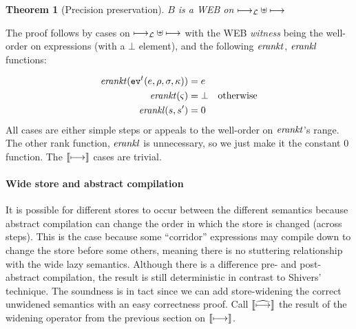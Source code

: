 \documentclass[9pt]{sigplanconf} %
\newtheorem{theorem}{Theorem}
\begin{document}
\begin{theorem}[Precision preservation]
$B$ is a WEB on $\lmachstep \uplus \machstep$
\end{theorem}

The proof follows by cases on $\lmachstep \uplus \machstep$ with the WEB \emph{witness} being the well-order on expressions (with a $\bot$ element), and the following $\erankt$, $\erankl$ functions:

\begin{align*}
\erankt(\ev[^\mcntr]{\mexp,\menv,\msto,\mkont}) &= \mexp \\
\erankt(\mstate) &= \bot \quad \text{otherwise} \\
\erankl(s,s') &= 0
\end{align*}
All cases are either simple steps or appeals to the well-order on $\erankt$'s range.
%
The other rank function, $\erankl$ is unnecessary, so we just make it the constant 0 function.
%
The $\cmachstep$ cases are trivial.

\paragraph{Wide store and abstract compilation}
%
 It is possible for different stores to occur between the different semantics because abstract compilation can change the order in which the store is changed (across steps).
%
 This is the case because some ``corridor'' expressions may compile down to change the store before some others, meaning there is no stuttering relationship with the wide lazy semantics.
%
%
%
 Although there is a difference pre- and post- abstract compilation, the result is still deterministic in contrast to Shivers' technique.
%
 The soundness is in tact since we can add store-widening the correct unwidened semantics with an easy correctness proof.
%
 Call $\camachstep$ the result of the widening operator from the previous section on $\cmachstep$.



\end{document}
